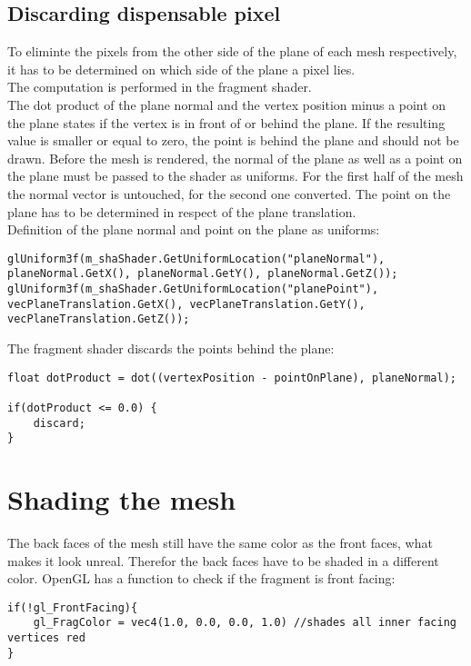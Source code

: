 \subsection{Discarding dispensable pixel}
To eliminte the pixels from the other side of the plane of each mesh respectively, it has to be determined on which side of the plane a pixel lies.\\
The computation is performed in the fragment shader.\\
The dot product of the plane normal and the vertex position minus a point on the plane states if the vertex is in front of or behind the plane. If the resulting value is smaller or equal to zero, the point is behind the plane and should not be drawn. Before the mesh is rendered, the normal of the plane as well as a point on the plane must be passed to the shader as uniforms. For the first half of the mesh the normal vector is untouched, for the second one converted. The point on the plane has to be determined in respect of the plane translation.\\
\newline
Definition of the plane normal and point on the plane as uniforms:
\begin{lstlisting}
glUniform3f(m_shaShader.GetUniformLocation("planeNormal"), planeNormal.GetX(), planeNormal.GetY(), planeNormal.GetZ());
glUniform3f(m_shaShader.GetUniformLocation("planePoint"), vecPlaneTranslation.GetX(), vecPlaneTranslation.GetY(), vecPlaneTranslation.GetZ());
\end{lstlisting}

The fragment shader discards the points behind the plane:
\begin{lstlisting}
float dotProduct = dot((vertexPosition - pointOnPlane), planeNormal);
		
if(dotProduct <= 0.0) {
	discard;
}
\end{lstlisting}

\section{Shading the mesh}
The back faces of the mesh still have the same color as the front faces, what makes it look unreal. Therefor the back faces have to be shaded in a different color. OpenGL has a function to check if the fragment is front facing:
\begin{lstlisting}
if(!gl_FrontFacing){
	gl_FragColor = vec4(1.0, 0.0, 0.0, 1.0) //shades all inner facing vertices red
}
\end{lstlisting}

